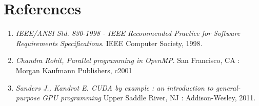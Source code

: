 \section{References}
	\begin{comment}
		$<$List any other documents or Web addresses to which this SRS refers. These may 
		include user interface style guides, contracts, standards, system requirements 
		specifications, use case documents, or a vision and scope document. Provide 
		enough information so that the reader could access a copy of each reference, 
		including title, author, version number, date, and source or location.$>$
	\end{comment}
	\begin{enumerate}
		\item \emph{IEEE/ANSI Std. 830-1998 - IEEE Recommended Practice for Software Requirements Specifications}. IEEE Computer Society, 1998.
		\item \emph{Chandra Rohit, Parallel programming in OpenMP}. San Francisco, CA : Morgan Kaufmann Publishers, c2001
		\item \emph{Sanders J., Kandrot E. CUDA by example : an introduction to general-purpose GPU programming} Upper Saddle River, NJ : Addison-Wesley, 2011.
	\end{enumerate}
